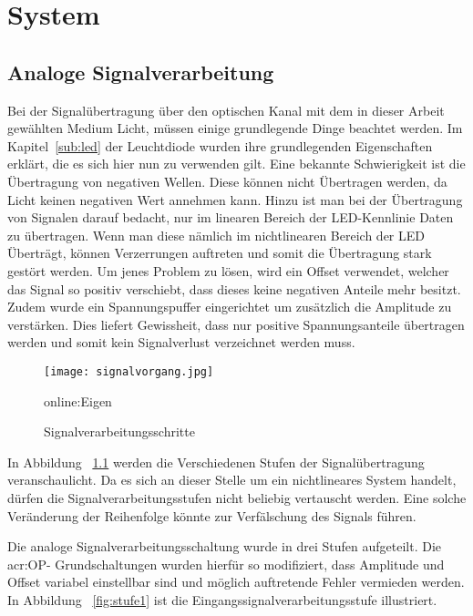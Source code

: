 
\chapter{System}
\label{sec:system}

\section{Analoge Signalverarbeitung}
\label{sec:Signalverarbeitung}
Bei der Signalübertragung über den optischen Kanal mit dem in dieser Arbeit gewählten Medium Licht, müssen einige grundlegende Dinge beachtet werden. Im Kapitel~\ref{sub:led} der Leuchtdiode wurden ihre grundlegenden Eigenschaften erklärt, die es sich hier nun zu verwenden gilt. Eine bekannte Schwierigkeit ist die Übertragung von negativen Wellen. Diese können nicht Übertragen werden, da Licht keinen negativen Wert annehmen kann. Hinzu ist man bei der Übertragung von Signalen darauf bedacht, nur im linearen Bereich der LED-Kennlinie Daten zu übertragen. Wenn man diese nämlich im nichtlinearen Bereich der LED Überträgt, können Verzerrungen auftreten und somit die Übertragung stark gestört werden. Um jenes Problem zu lösen, wird ein Offset verwendet, welcher das Signal so positiv verschiebt, dass dieses keine negativen Anteile mehr besitzt. Zudem wurde ein Spannungspuffer eingerichtet um zusätzlich die Amplitude zu verstärken. Dies liefert Gewissheit, dass nur positive Spannungsanteile übertragen werden und somit kein Signalverlust verzeichnet werden muss.

\begin{figure}[H]
	\centering
	\texttt{[image: signalvorgang.jpg]}
	\caption[Signalverarbeitungsschritte]{Signalverarbeitungsschritte} \gls{online:Eigen}
	\label{fig:signalvorgang}
\end{figure}

In Abbildung ~\ref{fig:signalvorgang} werden die Verschiedenen Stufen der Signalübertragung veranschaulicht. Da es sich an dieser Stelle um ein nichtlineares System handelt, dürfen die Signalverarbeitungsstufen nicht beliebig vertauscht werden. Eine solche Veränderung der Reihenfolge könnte zur Verfälschung des Signals führen. 

Die analoge Signalverarbeitungsschaltung wurde in drei Stufen aufgeteilt. Die \gls{acr:OP}- Grundschaltungen wurden hierfür so modifiziert, dass Amplitude und Offset variabel einstellbar sind und möglich auftretende Fehler vermieden werden. In Abbildung ~\ref{fig:stufe1} ist die Eingangssignalverarbeitungsstufe illustriert. 

